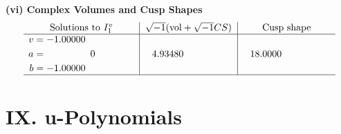 \documentclass[1p]{elsarticle_modified}
\theoremstyle{definition}
\newcommand{\I}{\sqrt{-1}}
\begin{document}
\newpage\flushleft \textbf{(vi) Complex Volumes and Cusp Shapes}
$$\begin{array}{c|c|c}  
\text{Solutions to }I^v_{1}& \I (\text{vol} + \sqrt{-1}CS) & \text{Cusp shape}\\
 \hline 
\begin{aligned}
v &= -1.00000\phantom{ +0.000000I} \\
a &= \phantom{-0.000000 } 0 \\
b &= -1.00000\phantom{ +0.000000I}\end{aligned}
 & \phantom{-}4.93480\phantom{ +0.000000I} & \phantom{-}18.0000\phantom{ +0.000000I}\\
 \hline 
 \end{array}$$\newpage
\newpage\renewcommand{\arraystretch}{1}
\centering \section*{ IX. u-Polynomials}
\end{document}
